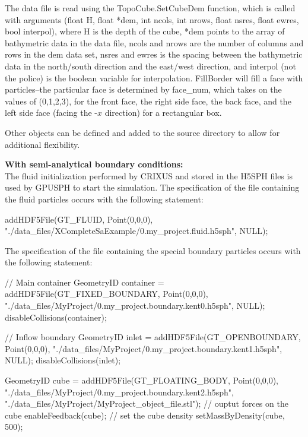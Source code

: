 The data file is read using the TopoCube.SetCubeDem function, which is
called with arguments (float H, float *dem, int ncols, int nrows, float
nsres, float ewres, bool interpol), where H is the depth of the cube,
*dem points to the array of bathymetric data in the data file, ncols and
nrows are the number of columns and rows in the dem data set, nsres and
ewres is the spacing between the bathymetric data in the north/south
direction and the east/west direction, and interpol (not the police) is
the boolean variable for interpolation. FillBorder will fill a face
with particles--the particular face is determined by face\_num, which
takes on the values of (0,1,2,3), for the front face, the right side
face, the back face, and the left side face (facing the -$x$ direction)
for a rectangular box.

Other objects can be defined and added to the source directory to allow
for additional flexibility.

\textbf{With semi-analytical boundary conditions:}\\

The fluid initialization performed by CRIXUS and stored in the H5SPH 
files is used by GPUSPH to start the simulation. 
The specification of the file containing the fluid particles occurs with the following statement:

\begin{ccode}
addHDF5File(GT_FLUID, Point(0,0,0), 
"./data_files/XCompleteSaExample/0.my_project.fluid.h5sph",
NULL);
\end{ccode}
The specification of the file containing the special boundary particles  occurs with the following statement:\\

\begin{ccode}
// Main container
GeometryID container =
addHDF5File(GT_FIXED_BOUNDARY, Point(0,0,0), 
  "./data_files/MyProject/0.my_project.boundary.kent0.h5sph",
  NULL);
disableCollisions(container);
  
// Inflow boundary 
GeometryID inlet =
  addHDF5File(GT_OPENBOUNDARY, Point(0,0,0), 
  "./data_files/MyProject/0.my_project.boundary.kent1.h5sph",
  NULL);
disableCollisions(inlet);

GeometryID cube =
  addHDF5File(GT_FLOATING_BODY, Point(0,0,0), 
  "./data_files/MyProject/0.my_project.boundary.kent2.h5sph",
  "./data_files/MyProject/MyProject_object_file.stl");
// ouptut forces on the cube
enableFeedback(cube);
// set the cube density
setMassByDensity(cube, 500);

\end{ccode}

